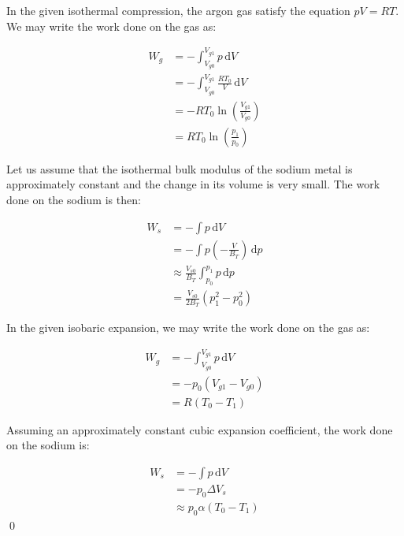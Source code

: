 \documentclass[12pt]{article}
\begin{document}
In the given isothermal compression, the argon gas satisfy the equation $pV = RT$. We may write the work done on the gas as:

\begin{equation}
    \begin{split}
        W_{g} &= -\int_{V_{g0}}^{V_{g1}} p \, \mathrm{d}V \\
        &= -\int_{V_{g0}}^{V_{g1}} \frac{RT_{0}}{V} \, \mathrm{d}V \\
        &= -RT_{0} \ln{\left( \frac{V_{g1}}{V_{g0}} \right)} \\
        &= RT_{0} \ln{\left( \frac{p_{1}}{p_{0}} \right)}
    \end{split}
\end{equation}

Let us assume that the isothermal bulk modulus of the sodium metal is approximately constant and the change in its volume is very small. The work done on the sodium is then:

\begin{equation}
    \begin{split}
        W_{s} &= -\int p \, \mathrm{d}V \\
        &= -\int p \left( -\frac{V}{B_{T}} \right) \, \mathrm{d}p \\
        &\approx \frac{V_{s0}}{B_{T}} \int_{p_{0}}^{p_{1}} p \, \mathrm{d}p \\
        &= \frac{V_{s0}}{2B_{T}} (p_{1}^{2} - p_{0}^{2})
    \end{split}
\end{equation}

In the given isobaric expansion, we may write the work done on the gas as:

\begin{equation}
    \begin{split}
        W_{g} &= -\int_{V_{g0}}^{V_{g1}} p \, \mathrm{d}V \\
        &= -p_{0} (V_{g1} - V_{g0}) \\
        &= R(T_{0} - T_{1})
    \end{split}
\end{equation}

Assuming an approximately constant cubic expansion coefficient, the work done on the sodium is:

\begin{equation}
    \begin{split}
        W_{s} &= -\int p \, \mathrm{d}V \\
        &= -p_{0} \Delta V_{s} \\
        &\approx p_{0} \alpha (T_{0} - T_{1})
    \end{split}
\end{equation}
\qed
\end{document}
